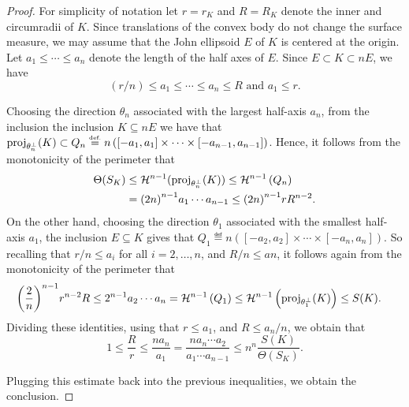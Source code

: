\documentclass[a4paper, 10pt, twoside]{amsart}
\numberwithin{equation}{section}
\theoremstyle{plain}
\theoremstyle{definition}
\begin{document}
\begin{proof}
For simplicity of notation let $r=r_K$ and $R=R_K$ denote the inner and circumradii of $K$. Since translations of the convex body do not change the surface measure, we may assume that the John ellipsoid $E$ of $K$ is centered at the origin. Let $a_1\leq\cdots\leq a_n$ denote the length of the half axes of $E$. Since $E\subset K\subset nE$, we have 
\[
    (r/n)\leq a_1\leq\cdots\leq a_n\leq R \mbox{ \ and \ }a_1\leq r.
\]

Choosing the direction $\theta_n$ associated with the largest half-axis $a_n$, from the inclusion the inclusion $K\subseteq nE$ we have that $\mathop{\rm proj}_{\theta_n^\perp}(K) \subset Q_n \stackrel{\mbox{\upshape\tiny def.}}{=} n\left([-a_1, a_1]\times \cdots\times [-a_{n-1}, a_{n-1}]\right)$. Hence, it follows from the monotonicity of the perimeter that 
\begin{align*}
    \Theta(S_K) 
    &\le 
    \mathcal{H}^{n-1}({\mathop{\rm proj}}_{\theta_n^\perp}(K)) 
    \le 
    \mathcal{H}^{n-1}
    \left(
        Q_n
    \right)\\
    &= 
    {(2n)}^{n-1}a_1\cdots a_{n-1}
    \le 
    {(2n)}^{n-1}r R^{n-2}.
\end{align*}
On the other hand, choosing the direction $\theta_1$ associated with the smallest half-axis $a_1$, the inclusion $E\subseteq K$ gives that $Q_1 \eqdef n\left( [-a_2, a_2]\times\cdots\times [-a_n,a_n]\right)$. So recalling that $r/n \le a_i$ for all $i=2,\dots,n$, and $R/n \le an$, it follows again from the monotonicity of the perimeter that
\begin{align*}
    {\left(\frac{2}{n}\right)}^{n-1} r^{n-2}R
    &\le 
    2^{n-1}a_2\cdots a_n 
    =
    \mathcal{H}^{n-1}\left(Q_1\right)
    \le
    \mathcal{H}^{n-1}\left({\mathop{\rm proj}}_{\theta_1^\perp}(K)\right) 
    \le
    S(K).
\end{align*}
Dividing these identities, using that $r \le a_1$, and $R \le a_n/n$, we obtain that 
\[  
    1 \le 
    \frac{R}{r} 
    \le 
    \frac{na_n}{a_1} 
    = 
    \frac{n a_n\cdots a_2}{a_1\cdots a_{n-1}} 
    \le 
    n^n
    \frac{S(K)}{\Theta(S_K)}.
\]

Plugging this estimate back into the previous inequalities, we obtain the conclusion. 
\end{proof} 
\end{document}
